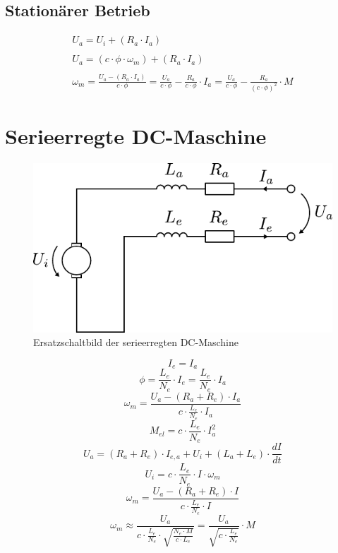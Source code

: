 \subsection{Stationärer Betrieb}
\[ \begin{array}{l}
U_a = U_i + (R_a \cdot I_a) \\\\
U_a = (c \cdot \phi \cdot \omega_m) + (R_a \cdot I_a) \\\\
\omega_m 
	= \frac{U_a - (R_a \cdot I_a)}{c \cdot \phi}
	= \frac{U_a}{c \cdot \phi} - \frac{R_a}{c \cdot \phi} \cdot I_a
	= \frac{U_a}{c \cdot \phi} - \frac{R_a}{(c \cdot \phi)^2} \cdot M
\end{array} \]

\newpage

\section{Serieerregte DC-Maschine}\label{sec:dc-motor-serie}

\begin{figure}[h!]
\centering
\includegraphics[scale=\schscale]{dc-motor-serie.pdf}
\caption{Ersatzschaltbild der serieerregten DC-Maschine}
\label{sch:dc-maschine-serie}
\end{figure}

\[ I_e = I_a \]
\[ \phi = \frac{L_e}{N_e} \cdot I_e = \frac{L_e}{N_e} \cdot I_a \]
\[ \omega_m = \frac{U_a - (R_a + R_e) \cdot I_a}{c \cdot \frac{L_e}{N_e} \cdot I_a} \]
\[ M_{el} = c \cdot \frac{L_e}{N_e} \cdot I_a^2 \]
\[ U_a = (R_a + R_e) \cdot I_{e,a} + U_i + (L_a + L_e) \cdot \frac{d I}{d t} \]
\[ U_i = c \cdot \frac{L_e}{N_e} \cdot I \cdot \omega_m \]
\[ \omega_m = \frac{U_a - (R_a + R_e) \cdot I}{c \cdot \frac{L_e}{N_e} \cdot I} \]
\[ \omega_m \approx \frac{U_a}{c \cdot \frac{L_e}{N_e} \cdot \sqrt{\frac{N_e \cdot M}{c \cdot L_e}}} 
	= \frac{U_a}{\sqrt{c \cdot \frac{L_e}{N_e}}} \cdot M \]

